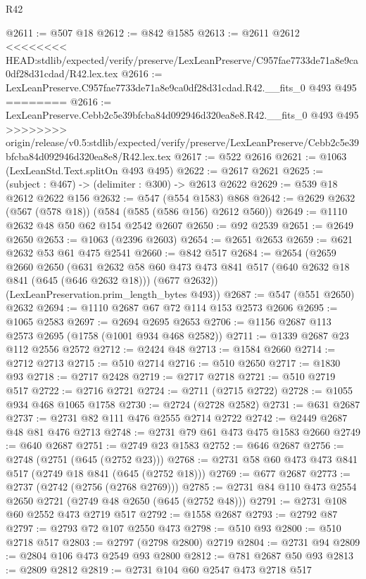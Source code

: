 \begin{lexlean}{R42}
\begin{coremodule}
{{{{{{{{{{{{{{{{{@2611 := @507 @18
@2612 := @842 @1585
@2613 := @2611 @2612
<<<<<<<< HEAD:stdlib/expected/verify/preserve/LexLeanPreserve/C957fae7733de71a8e9ca0df28d31cdad/R42.lex.tex
@2616 := LexLeanPreserve.C957fae7733de71a8e9ca0df28d31cdad.R42.__fits_0 @493 @495
========
@2616 := LexLeanPreserve.Cebb2c5e39bfcba84d092946d320ea8e8.R42.__fits_0 @493 @495
>>>>>>>> origin/release/v0.5:stdlib/expected/verify/preserve/LexLeanPreserve/Cebb2c5e39bfcba84d092946d320ea8e8/R42.lex.tex
@2617 := @522 @2616
@2621 := @1063 (LexLeanStd.Text.splitOn @493 @495)
@2622 := @2617 @2621
@2625 := (subject : @467) -> (delimiter : @300) -> @2613 @2622
@2629 := @539 @18 @2612 @2622 @156
@2632 := @547 (@554 @1583) @868
@2642 := @2629 @2632 (@567 (@578 @18)) (@584 (@585 (@586 @156) @2612 @560))
@2649 := @1110 @2632 @48 @50 @62 @154 @2542 @2607
@2650 := @92 @2539
@2651 := @2649 @2650
@2653 := @1063 (@2396 @2603)
@2654 := @2651 @2653
@2659 := @621 @2632 @53 @61 @475 @2541
@2660 := @842 @517
@2684 := @2654
    (@2659
      @2660
      @2650
      (@631
        @2632
        @58
        @60
        @473
        @473
        @841
        @517
        (@640 @2632 @18 @841 (@645 (@646 @2632 @18)))
        (@677 @2632))
      (LexLeanPreservation.prim_length_bytes @493))
@2687 := @547 (@551 @2650) @2632
@2694 := @1110 @2687 @67 @72 @114 @153 @2573 @2606
@2695 := @1065 @2583
@2697 := @2694 @2695 @2653
@2706 := @1156 @2687 @113 @2573 @2695 (@1758 (@1001 @934 @468 @2582))
@2711 := @1339 @2687 @23 @112 @2556 @2572
@2712 := @2424 @48
@2713 := @1584 @2660
@2714 := @2712 @2713
@2715 := @510 @2714
@2716 := @510 @2650
@2717 := @1830 @93
@2718 := @2717 @2428
@2719 := @2717 @2718
@2721 := @510 @2719 @517
@2722 := @2716 @2721
@2724 := @2711 (@2715 @2722)
@2728 := @1055 @934 @468 @1065 @1758
@2730 := @2724 (@2728 @2582)
@2731 := @631 @2687
@2737 := @2731 @82 @111 @476 @2555 @2714 @2722
@2742 := @2449 @2687 @48 @81 @476 @2713
@2748 := @2731 @79 @61 @473 @475 @1583 @2660
@2749 := @640 @2687
@2751 := @2749 @23 @1583
@2752 := @646 @2687
@2756 := @2748 (@2751 (@645 (@2752 @23)))
@2768 := @2731 @58 @60 @473 @473 @841 @517 (@2749 @18 @841 (@645 (@2752 @18)))
@2769 := @677 @2687
@2773 := @2737 (@2742 (@2756 (@2768 @2769)))
@2785 := @2731 @84 @110 @473 @2554 @2650 @2721 (@2749 @48 @2650 (@645 (@2752 @48)))
@2791 := @2731 @108 @60 @2552 @473 @2719 @517
@2792 := @1558 @2687
@2793 := @2792 @87
@2797 := @2793 @72 @107 @2550 @473
@2798 := @510 @93
@2800 := @510 @2718 @517
@2803 := @2797 (@2798 @2800) @2719
@2804 := @2731 @94
@2809 := @2804 @106 @473 @2549 @93 @2800
@2812 := @781 @2687 @50 @93
@2813 := @2809 @2812
@2819 := @2731 @104 @60 @2547 @473 @2718 @517
}}}}}}}}}}}}}}}}}
\end{coremodule}
\end{lexlean}
